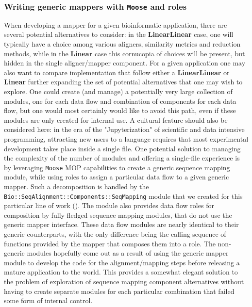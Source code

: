 \documentclass[10pt]{article}
\begin{document}
\subsubsection{Writing generic mappers with \texttt{Moose} and roles}
When developing a mapper for a given bioinformatic application, there are several potential alternatives to consider: in the \textbf{LinearLinear} case, one will typically have a choice among various aligners, similarity metrics and reduction methods, while in the \textbf{Linear} case this cornucopia of choices will be present, but hidden in the single aligner/mapper component. For a given application one may also want to compare implementation that follow either a \textbf{LinearLinear} or \textbf{Linear} further expanding the set of potential alternatives that one may wish to explore. One could create (and manage) a potentially very large collection of modules, one for each data flow and combination of components for each data flow, but one would most certainly would like to avoid this path, even if these modules are only created for internal use. A cultural feature should also be considered here: in the era of the "Jupyterization" of scientific and data intensive programming, attracting new users to a language requires that most experimental development takes place inside a single file.  
One potential solution to managing the complexity of the number of modules and offering a single-file experience is by leveraging \texttt{Moose} MOP capabilities to create a generic sequence mapping module, while using roles to assign a particular data flow to a given generic mapper. Such a decomposition is handled by the \texttt{Bio::SeqAlignment::Components::SeqMapping} module that we created for this particular line of work (). 
The module also provides data flow roles for composition by fully fledged sequence mapping modules, that do not use the generic mapper interface. These data flow modules are nearly identical to their generic counterparts, with the only difference being the calling sequence of functions provided by the mapper that composes them into a role. The non-generic modules hopefully come out as a result of using the generic mapper module to develop the code for the alignment/mapping steps before releasing a  mature application to the world. This provides a somewhat elegant solution to the problem of exploration of sequence mapping component alternatives without having to create separate modules for each particular combination that failed some form of internal control. 
\end{document}
